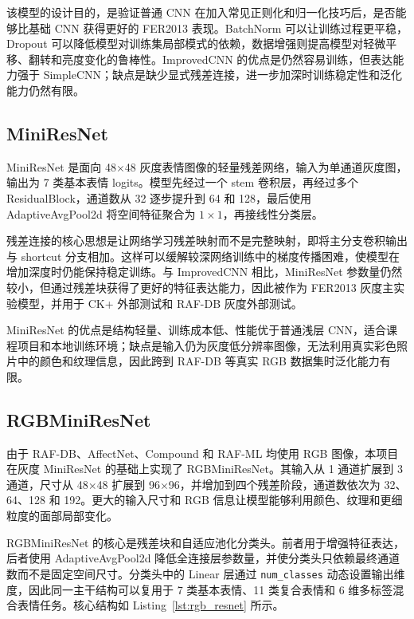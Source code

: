 \documentclass[UTF8,a4paper,12pt]{ctexart}
\newcommand{\code}[1]{\texttt{#1}}
\begin{document}
该模型的设计目的，是验证普通 CNN 在加入常见正则化和归一化技巧后，是否能够比基础 CNN 获得更好的 FER2013 表现。BatchNorm 可以让训练过程更平稳，Dropout 可以降低模型对训练集局部模式的依赖，数据增强则提高模型对轻微平移、翻转和亮度变化的鲁棒性。ImprovedCNN 的优点是仍然容易训练，但表达能力强于 SimpleCNN；缺点是缺少显式残差连接，进一步加深时训练稳定性和泛化能力仍然有限。

\subsection{MiniResNet}

MiniResNet 是面向 48$\times$48 灰度表情图像的轻量残差网络，输入为单通道灰度图，输出为 7 类基本表情 logits。模型先经过一个 stem 卷积层，再经过多个 ResidualBlock，通道数从 32 逐步提升到 64 和 128，最后使用 AdaptiveAvgPool2d 将空间特征聚合为 $1\times1$，再接线性分类层。

残差连接的核心思想是让网络学习残差映射而不是完整映射，即将主分支卷积输出与 shortcut 分支相加。这样可以缓解较深网络训练中的梯度传播困难，使模型在增加深度时仍能保持稳定训练。与 ImprovedCNN 相比，MiniResNet 参数量仍然较小，但通过残差块获得了更好的特征表达能力，因此被作为 FER2013 灰度主实验模型，并用于 CK+ 外部测试和 RAF-DB 灰度外部测试。

MiniResNet 的优点是结构轻量、训练成本低、性能优于普通浅层 CNN，适合课程项目和本地训练环境；缺点是输入仍为灰度低分辨率图像，无法利用真实彩色照片中的颜色和纹理信息，因此跨到 RAF-DB 等真实 RGB 数据集时泛化能力有限。

\subsection{RGBMiniResNet}

由于 RAF-DB、AffectNet、Compound 和 RAF-ML 均使用 RGB 图像，本项目在灰度 MiniResNet 的基础上实现了 RGBMiniResNet。其输入从 1 通道扩展到 3 通道，尺寸从 48$\times$48 扩展到 96$\times$96，并增加到四个残差阶段，通道数依次为 32、64、128 和 192。更大的输入尺寸和 RGB 信息让模型能够利用颜色、纹理和更细粒度的面部局部变化。

RGBMiniResNet 的核心是残差块和自适应池化分类头。前者用于增强特征表达，后者使用 AdaptiveAvgPool2d 降低全连接层参数量，并使分类头只依赖最终通道数而不是固定空间尺寸。分类头中的 Linear 层通过 \code{num\_classes} 动态设置输出维度，因此同一主干结构可以复用于 7 类基本表情、11 类复合表情和 6 维多标签混合表情任务。核心结构如 Listing~\ref{lst:rgb_resnet} 所示。
\end{document}
